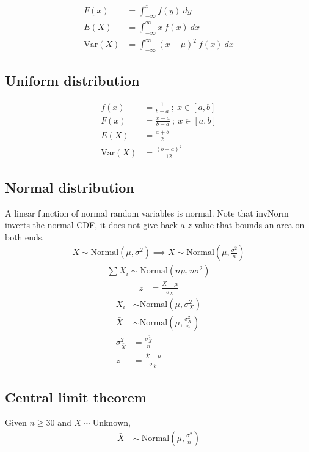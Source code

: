 \documentclass{article}
\newcommand{\var}{\text{Var}}
\newcommand{\normal}{\text{Normal}}
\newcommand{\soft}[1]{\left( #1 \right)}
\begin{document}
\begin{multicols*}{2}
\begin{align*}
    F(x) &= \int_{-\infty}^x f(y) \ dy \\
    E(X) &= \int_{-\infty}^\infty x \ f(x) \ dx \\
    \var(X) &= \int_{-\infty}^\infty (x - \mu)^2 \ f(x) \ dx
\end{align*}

\subsection{Uniform distribution}
\begin{align*}
    f(x) &= \frac{1}{b - a} \ ; \ x \in [a, b] \\
    F(x) &= \frac{x - a}{b - a} \ ; \ x \in [a, b] \\
    E(X) &= \frac{a + b}{2} \\
    \var(X) &= \frac{(b - a)^2}{12}
\end{align*}

\subsection{Normal distribution}
A linear function of normal random variables is normal. Note that invNorm inverts the normal CDF, it does not give back a $z$ value that bounds an area on both ends.
\begin{align*}
    X \sim \normal(\mu, \sigma^2) \implies \bar{X} \sim \normal\soft{\mu, \frac{\sigma^2}{n}}
\end{align*}
\begin{align*}
    \sum X_i \sim \normal(n\mu, n\sigma^2)
\end{align*}
\begin{align*}
    z &= \frac{X - \mu}{\sigma_X}
\end{align*}
\begin{align*}
    X_i &\sim \normal(\mu, \sigma_X^2) \\
    \bar{X} &\sim \normal\soft{\mu, \frac{\sigma_X^2}{n}} \\
    \sigma_{\bar{X}}^2 &= \frac{\sigma_X^2}{n} \\
    z &= \frac{\bar{X} - \mu}{\sigma_{\bar{X}}}
\end{align*}

\subsection{Central limit theorem}
Given $n \geq 30$ and $X \sim \text{Unknown}$,
\begin{align*}
    \bar{X} \ &\dot{\sim} \ \normal\soft{\mu, \frac{\sigma^2}{n}}
\end{align*}


\end{multicols*}
\end{document}
